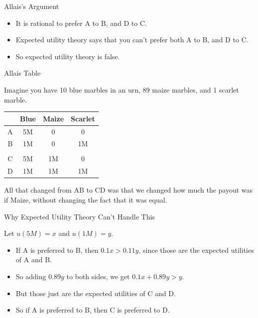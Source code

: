 \documentclass[
  ignorenonframetext,
]{beamer}
\providecommand{\tightlist}{%
  \setlength{\itemsep}{0pt}\setlength{\parskip}{0pt}}
\renewcommand{\,}{\text{, }}
\begin{document}
\begin{frame}{Allais's Argument}
\protect\hypertarget{allaiss-argument}{}

\begin{itemize}
\tightlist
\item
  It is rational to prefer A to B, and D to C. \pause
\item
  Expected utility theory says that you can't prefer both A to B, and D
  to C. \pause
\item
  So expected utility theory is false.
\end{itemize}

\end{frame}

\begin{frame}{Allais Table}
\protect\hypertarget{allais-table}{}

Imagine you have 10 blue marbles in an urn, 89 maize marbles, and 1
scarlet marble.

\begin{longtable}[]{@{}cccc@{}}
\toprule
& Blue & Maize & Scarlet\tabularnewline
\midrule
\endhead
A & 5M & 0 & 0\tabularnewline
B & 1M & 0 & 1M\tabularnewline
& & &\tabularnewline
C & 5M & 1M & 0\tabularnewline
D & 1M & 1M & 1M\tabularnewline
\bottomrule
\end{longtable}

All that changed from AB to CD was that we changed how much the payout
was if Maize, without changing the fact that it was equal.

\end{frame}

\begin{frame}{Why Expected Utility Theory Can't Handle This}
\protect\hypertarget{why-expected-utility-theory-cant-handle-this}{}

Let \(u(5M) = x\) and \(u(1M) = y\).

\begin{itemize}
\tightlist
\item
  If A is preferred to B, then \(0.1x > 0.11y\), since those are the
  expected utilities of A and B. \pause
\item
  So adding \(0.89y\) to both sides, we get \(0.1x + 0.89y > y\). \pause
\item
  But those just are the expected utilities of C and D.
\item
  So if A is preferred to B, then C is preferred to D.
\end{itemize}

\end{frame}
\end{document}
